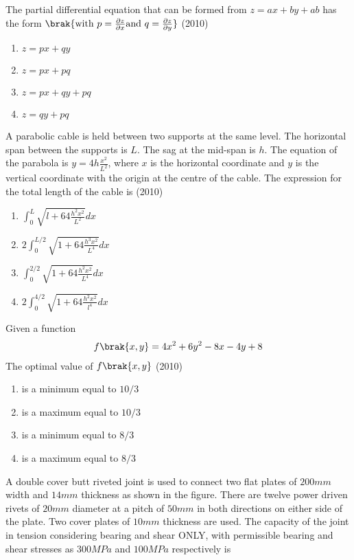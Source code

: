        \item The partial differential equation that can be formed from $z=a x+b y+a b$ has the form $\brak{\text{with } p=\frac{\partial z}{\partial x} \text{and } q=\frac{\partial z}{\partial y}}$
       \hfill{(2010)}
		\begin{enumerate}
			\item $z=p x+q y$
			\item $z=p x+p q$
			\item $z=p x+q y+p q$
			\item $z=q y+p q$
		\end{enumerate}
	\item  A parabolic cable is held between two supports at the same level. The horizontal span between the supports is $L$. The sag at the mid-span is $h$. The equation of the parabola is $y=4 h \frac{x^{2}}{L^{2}}$, where $x$ is the horizontal coordinate and $y$ is the vertical coordinate with the origin at the centre of the cable. The expression for the total length of the cable is
	\hfill{(2010)}
		\begin{enumerate}
			\item $\int_{0}^{L} \sqrt{l+64 \frac{h^{2} x^{2}}{L^{2}}} d x$
			\item $2 \int_{0}^{L / 2} \sqrt{1+64 \frac{h^{3} x^{2}}{L^{4}}} d x$
			\item $\int_{0}^{2 / 2} \sqrt{1+64 \frac{h^{2} x^{2}}{L^{4}}} d x$
	        \item $2 \int_{0}^{4 / 2} \sqrt{1+64 \frac{h^{2} x^{2}}{l^{4}}} d x$
        	\end{enumerate}
	\item Given a function 
          \begin{align*}
           f\brak{x, y}=4 x^{2}+6 y^{2}-8 x-4 y+8
           \end{align*}
           The optimal value of $f\brak{x, y}$
           \hfill{(2010)}
		\begin{enumerate}
		       \item is a minimum equal to $10 / 3$
		       \item is a maximum equal to $10 / 3$
		       \item is a minimum equal to $8 / 3$
		       \item is a maximum equal to $8 / 3$
        	\end{enumerate}	
	\item A double cover butt riveted joint is used to connect two flat plates of $200 mm$ width and $14 mm$ thickness as shown in the figure. There are twelve power driven rivets of $20 mm$ diameter at a pitch of $50 mm$ in both directions on either side of the plate. Two cover plates of $10 mm$ thickness are used. The capacity of the joint in tension considering bearing and shear ONLY, with permissible bearing and shear stresses as $300 MPa$ and $100 MPa$ respectively is
